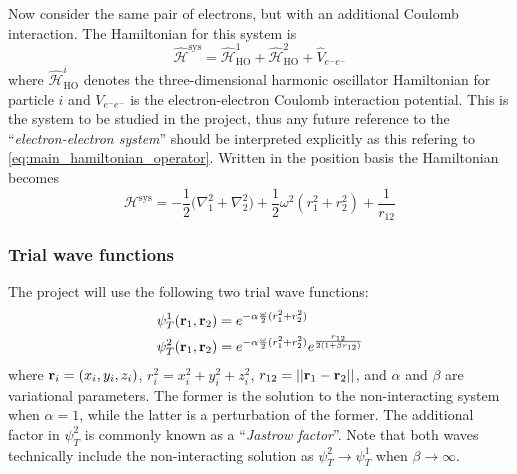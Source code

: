 \documentclass[nofootinbib,reprint,english]{revtex4-1}
\newcommand{\hatHH}{\hat{\mathcal{H}}}
\newcommand{\HH}{\mathcal{H}}
\begin{document}
Now consider the same pair of electrons, but with an additional Coulomb interaction. The Hamiltonian for this system is
\begin{equation}\label{eq:main_hamiltonian_operator}
\hatHH^\text{sys}=\hatHH_\text{HO}^1+\hatHH_\text{HO}^2+\hat{V}_{e^-e^-}
\end{equation}
where \(\hatHH_\text{HO}^i\) denotes the three-dimensional harmonic oscillator Hamiltonian for particle \(i\) and \(V_{e^-e^-}\) is the electron-electron Coulomb interaction potential. This is the system to be studied in the project, thus any future reference to the ``\emph{electron-electron system}'' should be interpreted explicitly as this refering to \eqref{eq:main_hamiltonian_operator}. Written in the position basis the Hamiltonian becomes
\begin{equation}\label{eq:main_hamiltonian_position_basis}
\HH^\text{sys}=-\frac{1}{2}\big(\nabla_1^2+\nabla_2^2\big)+\frac{1}{2}\omega^2(r_1^2+r_2^2)+\frac{1}{r_{12}}
\end{equation}
\subsubsection{Trial wave functions}
The project will use the following two trial wave functions:
\begin{subequations}\label{eq:trial_wavefunctions}
\begin{align}
\psi_T^1(\vb{r}_1,\vb{r}_2)&=e^{-\alpha\frac{\omega}{2}(r_1^2+r_2^2)}\label{eq:wave1}\\
\psi_T^2(\vb{r}_1,\vb{r}_2)&=e^{-\alpha\frac{\omega}{2}(r_1^2+r_2^2)}e^{\frac{r_{12}}{2(1+\beta r_{12})}}\label{eq:wave2}
\end{align}
\end{subequations}
where \(\vb{r}_i=(x_i,y_i,z_i)\), \(r_i^2=x_i^2+y_i^2+z_i^2\), \(r_{12}=||\vb{r}_1-\vb{r}_2||\), and \(\alpha\) and \(\beta\) are variational parameters. The former is the solution to the non-interacting system when \(\alpha=1\), while the latter is a perturbation of the former. The additional factor in \(\psi_T^2\) is commonly known as a ``\emph{Jastrow factor}''. Note that both waves technically include the non-interacting solution as \(\psi_T^2\to\psi_T^1\) when \(\beta\to\infty\).
\end{document}
